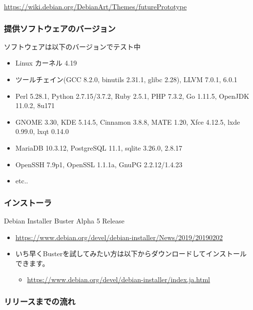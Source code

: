 \documentclass[mingoth,a4paper]{jsarticle}
\begin{document}
\url{https://wiki.debian.org/DebianArt/Themes/futurePrototype}




\subsubsection{提供ソフトウェアのバージョン}



ソフトウェアは以下のバージョンでテスト中

\begin{itemize}
\item Linux カーネル 4.19
\item ツールチェイン(GCC 8.2.0, binutils 2.31.1, glibc 2.28), LLVM 7.0.1, 6.0.1
\item Perl 5.28.1, Python 2.7.15/3.7.2, Ruby 2.5.1, PHP 7.3.2, Go 1.11.5, OpenJDK 11.0.2, 8u171
\item GNOME 3.30, KDE 5.14.5, Cinnamon 3.8.8, MATE 1.20, Xfce 4.12.5, lxde 0.99.0, lxqt 0.14.0
\item MariaDB 10.3.12, PostgreSQL 11.1, sqlite 3.26.0, 2.8.17 
\item OpenSSH 7.9p1, OpenSSL 1.1.1a, GnuPG 2.2.12/1.4.23
\item etc..
\end{itemize}




\subsubsection{インストーラ}


Debian Installer Buster Alpha 5 Release

\begin{itemize}
  \item \url{https://www.debian.org/devel/debian-installer/News/2019/20190202}
  \item いち早くBusterを試してみたい方は以下からダウンロードしてインストールできます。
  \begin{itemize}
    \item \url{https://www.debian.org/devel/debian-installer/index.ja.html}
  \end{itemize}
\end{itemize}




\subsubsection{リリースまでの流れ}
\end{document}
